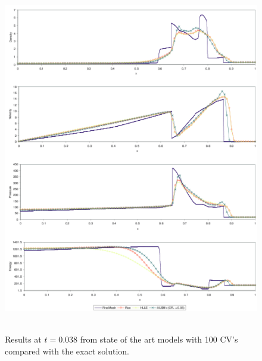 \begin{figure}[H]
\vbox{
\hbox{
\hspace{-1.cm}
\includegraphics[width=16.0cm]{./doc_figures/shock/Screenshot-blast-wave-prob-res}
}
\vspace{-0.cm}
\vspace{-0.cm}}
\label{Screenshot-blast-wave-prob-res}
\caption{ Results at $t=0.038$ from state of the art models 
with 100 CV's compared with the exact solution.   }
\end{figure}

